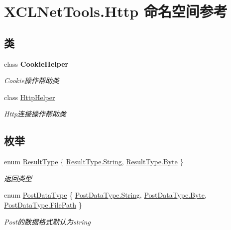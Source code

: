 \hypertarget{namespace_x_c_l_net_tools_1_1_http}{}\section{X\+C\+L\+Net\+Tools.\+Http 命名空间参考}
\label{namespace_x_c_l_net_tools_1_1_http}
\subsection*{类}
\begin{DoxyCompactItemize}
\item 
class {\bfseries Cookie\+Helper}
\begin{DoxyCompactList}\small\item\em Cookie操作帮助类 \end{DoxyCompactList}\item 
class \hyperlink{class_x_c_l_net_tools_1_1_http_1_1_http_helper}{Http\+Helper}
\begin{DoxyCompactList}\small\item\em Http连接操作帮助类 \end{DoxyCompactList}\end{DoxyCompactItemize}
\subsection*{枚举}
\begin{DoxyCompactItemize}
\item 
enum \hyperlink{namespace_x_c_l_net_tools_1_1_http_a3216524397972f7d0c5733b123216e9e}{Result\+Type} \{ \hyperlink{namespace_x_c_l_net_tools_1_1_http_a3216524397972f7d0c5733b123216e9ea27118326006d3829667a400ad23d5d98}{Result\+Type.\+String}, 
\hyperlink{namespace_x_c_l_net_tools_1_1_http_a3216524397972f7d0c5733b123216e9eaa245c3230debe5c956484ecc6fa93877}{Result\+Type.\+Byte}
 \}\begin{DoxyCompactList}\small\item\em 返回类型 \end{DoxyCompactList}
\item 
enum \hyperlink{namespace_x_c_l_net_tools_1_1_http_ad73fffd49af2087d4f5c0a954d15d08c}{Post\+Data\+Type} \{ \hyperlink{namespace_x_c_l_net_tools_1_1_http_ad73fffd49af2087d4f5c0a954d15d08ca27118326006d3829667a400ad23d5d98}{Post\+Data\+Type.\+String}, 
\hyperlink{namespace_x_c_l_net_tools_1_1_http_ad73fffd49af2087d4f5c0a954d15d08caa245c3230debe5c956484ecc6fa93877}{Post\+Data\+Type.\+Byte}, 
\hyperlink{namespace_x_c_l_net_tools_1_1_http_ad73fffd49af2087d4f5c0a954d15d08ca2fb403e71d8ade2ba79af3f6c4695d09}{Post\+Data\+Type.\+File\+Path}
 \}\begin{DoxyCompactList}\small\item\em Post的数据格式默认为string \end{DoxyCompactList}
\end{DoxyCompactItemize}


